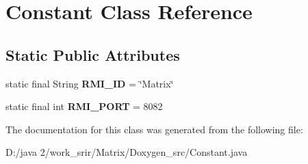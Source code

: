 \hypertarget{class_constant}{}\section{Constant Class Reference}
\label{class_constant}
\subsection*{Static Public Attributes}
\begin{DoxyCompactItemize}
\item 
\hypertarget{class_constant_abbee07791e6042920828ed533efabbb7}{}static final String {\bfseries R\+M\+I\+\_\+\+I\+D} = \char`\"{}Matrix\char`\"{}\label{class_constant_abbee07791e6042920828ed533efabbb7}

\item 
\hypertarget{class_constant_a3724cc2248533bef4665190d2acb5fbb}{}static final int {\bfseries R\+M\+I\+\_\+\+P\+O\+R\+T} = 8082\label{class_constant_a3724cc2248533bef4665190d2acb5fbb}

\end{DoxyCompactItemize}


The documentation for this class was generated from the following file\+:\begin{DoxyCompactItemize}
\item 
D\+:/java 2/work\+\_\+srir/\+Matrix/\+Doxygen\+\_\+src/Constant.\+java\end{DoxyCompactItemize}
